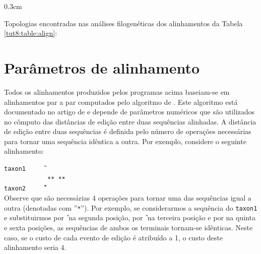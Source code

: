 \begin{refsection}
\begin {myindentpar}{0.3cm}
\begin{enumerate}[\itshape i.]
\end{enumerate}
\end{myindentpar}

Topologias encontradas nas análises filogenéticas dos alinhamentos da Tabela \ref{tut8:table:align}:\\


\newpage
\section{Parâmetros de alinhamento}\label{tut8:par}

Todos os alinhamentos produzidos pelos programas acima baseiam-se em alinhamentos par a par computados pelo algoritmo de \textcite{Needleman_and_Wunsch_1970}. Este algoritmo está documentado no artigo de \textcite{Phillips_et_al_2000} e depende de parâmetros numéricos que são utilizados no cômputo das distâncias de edição entre duas sequências alinhadas. A distância de edição entre duas sequências é definida pelo número de operações necessárias para tornar uma sequência idêntica a outra. Por exemplo, considere o seguinte alinhamento:

\indent\indent\indent\indent\indent\indent\indent\texttt{taxon1~~~~~\T\A\T\G\gap\gap\A}\\
\indent\indent\indent\indent\indent\indent\indent\texttt{~~~~~~~~~~~~**~**~}\\
\indent\indent\indent\indent\indent\indent\indent\texttt{taxon2~~~~~\T\G\G\G\C\C\A}\\

Observe que são necessárias 4 operações para tornar uma das sequências igual a outra (denotadas com ''\texttt{*}''). Por exemplo, se considerarmos a sequência do \texttt{taxon1} e substituirmos \texttt{\A} por \texttt{\G} na segunda posição, \texttt{\T} por \texttt{\G} na terceira posição e \texttt{\gap} por \texttt{\C} na quinta e sexta posições, as sequências de ambos os terminais tornam-se idênticas. Neste caso, se o custo de cada evento de edição é atribuído a 1, o custo deste alinhamento seria 4. 


\end{refsection}
